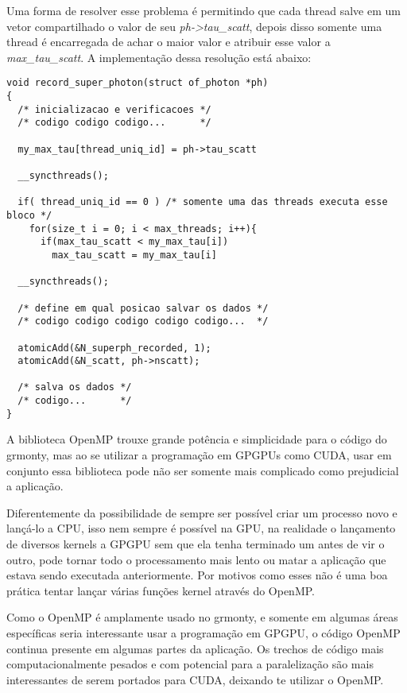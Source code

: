     Uma forma de resolver esse problema é permitindo que cada thread salve em um vetor compartilhado o valor de seu \textit{ph->tau\_scatt}, depois disso somente uma thread é encarregada de achar o maior valor e atribuir esse valor a \textit{max\_tau\_scatt}. A implementação dessa resolução está abaixo:

    \begin{lstlisting}
void record_super_photon(struct of_photon *ph)
{
  /* inicializacao e verificacoes */
  /* codigo codigo codigo...      */

  my_max_tau[thread_uniq_id] = ph->tau_scatt

  __syncthreads();

  if( thread_uniq_id == 0 ) /* somente uma das threads executa esse bloco */
    for(size_t i = 0; i < max_threads; i++){
      if(max_tau_scatt < my_max_tau[i])
        max_tau_scatt = my_max_tau[i]

  __syncthreads();

  /* define em qual posicao salvar os dados */
  /* codigo codigo codigo codigo codigo...  */

  atomicAdd(&N_superph_recorded, 1);
  atomicAdd(&N_scatt, ph->nscatt);

  /* salva os dados */
  /* codigo...      */
}
    \end{lstlisting}

    A biblioteca OpenMP trouxe grande potência e simplicidade para o código do grmonty, mas ao se utilizar a programação em GPGPUs como CUDA, usar em conjunto essa biblioteca pode não ser somente mais complicado como prejudicial a aplicação.

    Diferentemente da possibilidade de sempre ser possível criar um processo novo e lançá-lo a CPU, isso nem sempre é possível na GPU, na realidade o lançamento de diversos kernels a GPGPU sem que ela tenha terminado um antes de vir o outro, pode tornar todo o processamento mais lento ou matar a aplicação que estava sendo executada anteriormente. Por motivos como esses não é uma boa prática tentar lançar várias funções kernel através do OpenMP.

    Como o OpenMP é amplamente usado no grmonty, e somente em algumas áreas específicas seria interessante usar a programação em GPGPU, o código OpenMP continua presente em algumas partes da aplicação. Os trechos de código mais computacionalmente pesados e com potencial para a paralelização são mais interessantes de serem portados para CUDA, deixando te utilizar o OpenMP.

